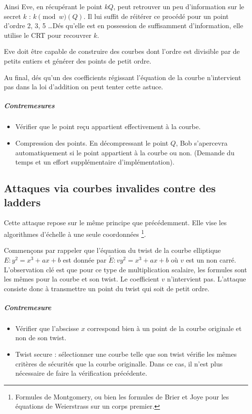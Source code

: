 \documentclass[a4paper]{report}
\begin{document}
Ainsi Eve, en récupérant le point $kQ$, peut retrouver un peu d'information sur le secret $k$ : $k \pmod w(Q)$. Il lui suffit de réitérer ce procédé pour un point d'ordre 2, 3, 5 \ldots Dés qu'elle est en possession de suffisamment d'information, elle utilise le CRT pour recouvrer $k$.

Eve doit être capable de construire des courbes dont l'ordre est divisible par de petits entiers et générer des points de petit ordre.

Au final, dés qu'un des coefficients régissant l'équation de la courbe n'intervient pas dans la loi d'addition on peut tenter cette astuce.

\subparagraph{Contremesures}
\begin{itemize}[label=$\rightarrow$]
    \item Vérifier que le point reçu appartient effectivement à la courbe.
    \item Compression des points. En décompressant le point $Q$, Bob s'apercevra automatiquement si le point appartient à la courbe ou non. (Demande du temps et un effort supplémentaire d'implémentation).
\end{itemize}


\subsection{Attaques via courbes invalides contre des ladders}
Cette attaque repose sur le même principe que précédemment. Elle vise les algorithmes d'échelle à une seule coordonnées \footnote{Formules de Montgomery, ou bien les formules de Brier et Joye pour les équations de Weierstrass sur un corps premier.}. 

Commençons par rappeler que l'équation du twist de la courbe elliptique $E : y^2 = x^3 + ax + b$ est donnée par $\tilde{E} : vy^2 = x^3 + ax + b$ où $v$ est un non carré. L'observation clé est que pour ce type de multiplication scalaire, les formules sont les mêmes pour la courbe et son twist. Le coefficient $v$ n'intervient pas. L'attaque consiste donc à transmettre un point du twist qui soit de petit ordre.

\subparagraph{Contremesure}
\begin{itemize}[label=$\rightarrow$]
    \item Vérifier que l'abscisse $x$ correspond bien à un point de la courbe originale et non de son twist.
    \item Twist secure : sélectionner une courbe telle que son twist vérifie les mêmes critères de sécurités que la courbe originalle. Dans ce cas, il n'est plus nécessaire de faire la vérification précédente.
\end{itemize}
\end{document}
